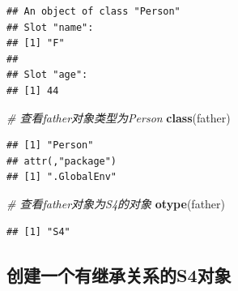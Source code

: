 \documentclass[]{book}
\newenvironment{Shaded}{\begin{snugshade}}{\end{snugshade}}
\newcommand{\KeywordTok}[1]{\textcolor[rgb]{0.13,0.29,0.53}{\textbf{#1}}}
\newcommand{\CommentTok}[1]{\textcolor[rgb]{0.56,0.35,0.01}{\textit{#1}}}
\newcommand{\NormalTok}[1]{#1}
\begin{document}
\begin{verbatim}
## An object of class "Person"
## Slot "name":
## [1] "F"
## 
## Slot "age":
## [1] 44
\end{verbatim}

\begin{Shaded}
\begin{Highlighting}[]
\CommentTok{# 查看father对象类型为Person}
\KeywordTok{class}\NormalTok{(father)}
\end{Highlighting}
\end{Shaded}

\begin{verbatim}
## [1] "Person"
## attr(,"package")
## [1] ".GlobalEnv"
\end{verbatim}

\begin{Shaded}
\begin{Highlighting}[]
\CommentTok{# 查看father对象为S4的对象}
\KeywordTok{otype}\NormalTok{(father)}
\end{Highlighting}
\end{Shaded}

\begin{verbatim}
## [1] "S4"
\end{verbatim}

\subsection{创建一个有继承关系的S4对象}\label{s4}
\end{document}
